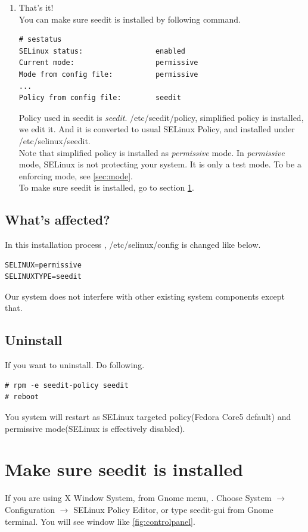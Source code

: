 \documentclass{article}
\begin{document}
\begin{enumerate}
 \item That's it!\\
You can make sure seedit is installed by following command.
\begin{verbatim}
# sestatus
SELinux status:                 enabled
Current mode:                   permissive
Mode from config file:          permissive
...
Policy from config file:        seedit
\end{verbatim}

Policy used in seedit is {\it seedit}.
/etc/seedit/policy, simplified policy is installed, we edit it.
And it is converted to usual SELinux Policy, and installed under  /etc/selinux/seedit.\\
Note that simplified policy is installed as {\it permissive} mode.
In {\it permissive} mode, SELinux is not protecting your system. It is
 only a test mode. To be a enforcing mode, see \ref{sec:mode}.\\
To make sure seedit is installed, go to section \ref{sec:makesure}.
\end{enumerate}

 \subsection{What's affected?}
 In this installation process ,
/etc/selinux/config is changed like below.
\begin{verbatim}
SELINUX=permissive	
SELINUXTYPE=seedit
\end{verbatim}
Our system does not interfere with other existing system components
except that.
\subsection{Uninstall}
If you want to uninstall. Do following.
\begin{verbatim}
# rpm -e seedit-policy seedit	
# reboot
\end{verbatim}
You system will restart as SELinux targeted policy(Fedora Core5 default)
and permissive mode(SELinux is effectively disabled).

\section{Make sure seedit is installed}\label{sec:makesure}

If you are using X Window System,  from  Gnome menu, 
. Choose System $\rightarrow$ Configuration $\rightarrow$ SELinux
Policy Editor, or type seedit-gui from Gnome terminal.
You will see window like \ref{fig:controlpanel}.
\end{document}
